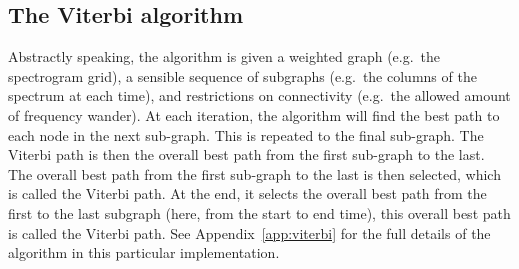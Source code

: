 \documentclass[paper-main.tex]{subfiles}
\begin{document}




\subsection{The Viterbi algorithm}
\label{sec:viterbi}



Abstractly speaking, the algorithm is given a weighted graph (e.g.\ the spectrogram grid), a sensible sequence of subgraphs (e.g.\ the columns of the spectrum at each time), and restrictions on connectivity (e.g.\ the allowed amount of frequency wander). 
At each iteration, the algorithm will find the best path to each node in the next sub-graph. 
This is repeated to the final sub-graph. 
The Viterbi path is then the overall best path from the first sub-graph to the last. 
The overall best path from the first sub-graph to the last is then selected, which is called the Viterbi path. 
At the end, it selects the overall best path from the first to the last subgraph (here, from the start to end time), this overall best path is called the Viterbi path. 
See Appendix~\ref{app:viterbi} for the full details of the algorithm in this particular implementation.
\end{document}
